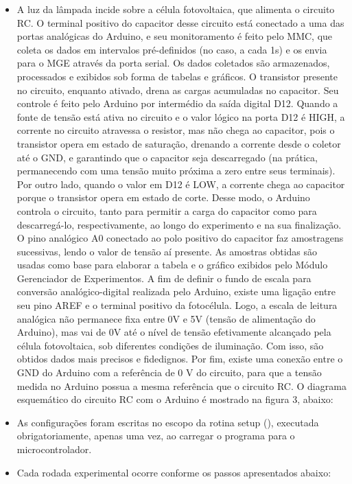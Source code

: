 \documentclass{article}
\begin{document}
\begin{itemize}
\begin{itemize}
\begin{itemize}
			\item A luz da lâmpada incide sobre a célula fotovoltaica, que alimenta o circuito RC. O terminal positivo do capacitor desse circuito está conectado a uma das portas analógicas do Arduino, e seu monitoramento é feito pelo MMC, que coleta os dados em intervalos pré-definidos (no caso, a cada 1s) e os envia para o MGE através da porta serial. Os dados coletados são armazenados, processados e exibidos sob forma de tabelas e gráficos. O transistor presente no circuito, enquanto ativado, drena as cargas acumuladas no capacitor. Seu controle é feito pelo Arduino por intermédio da saída digital D12. Quando a fonte de tensão está ativa no circuito e o valor lógico na porta D12 é HIGH, a corrente no circuito atravessa o resistor, mas não chega ao capacitor, pois o transistor opera em estado de saturação, drenando a corrente desde o coletor até o GND, e garantindo que o capacitor seja descarregado (na prática, permanecendo com uma tensão muito próxima a zero entre seus terminais). Por outro lado, quando o valor em D12 é LOW, a corrente chega ao capacitor porque o transistor opera em estado de corte. Desse modo, o Arduino controla o circuito, tanto para permitir a carga do capacitor como para descarregá-lo, respectivamente, ao longo do experimento e na sua finalização. O pino analógico A0 conectado ao polo positivo do capacitor faz amostragens sucessivas, lendo o valor de tensão aí presente. As amostras obtidas são usadas como base para elaborar a tabela e o gráfico exibidos pelo Módulo Gerenciador de Experimentos. A fim de definir o fundo de escala para conversão analógico-digital realizada pelo Arduino, existe uma ligação entre seu pino AREF e o terminal positivo da fotocélula. Logo, a escala de leitura analógica não permanece fixa entre 0V e 5V (tensão de alimentação do Arduino), mas vai de 0V até o nível de tensão efetivamente alcançado pela célula fotovoltaica, sob diferentes condições de iluminação. Com isso, são obtidos dados mais precisos e fidedignos. Por fim, existe uma conexão entre o GND do Arduino com a referência de 0 V do circuito, para que a tensão medida no Arduino possua a mesma referência que o circuito RC. O diagrama esquemático do circuito RC com o Arduino é mostrado na figura 3, abaixo: \cite{rogerio}
			\item As configurações foram escritas no escopo da rotina setup (), executada obrigatoriamente, apenas uma vez, ao carregar o programa para o microcontrolador. \cite{rogerio}
			\item Cada rodada experimental ocorre conforme os passos apresentados abaixo: \cite{rogerio}

\end{itemize}
\end{itemize}
\end{itemize}
\end{document}
